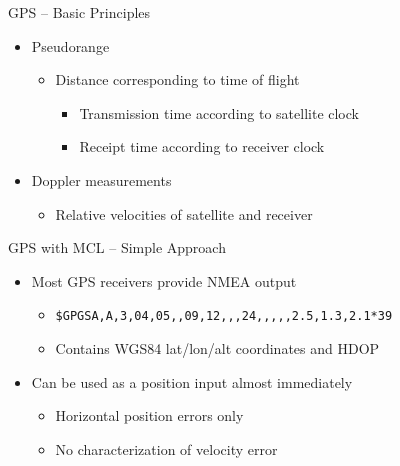 \documentclass[utf8,12pt]{beamer}
\begin{document}
{
\begin{frame}{GPS -- Basic Principles}
    \begin{itemize}
        \item Pseudorange
        \begin{itemize}
            \item Distance corresponding to time of flight
            \begin{itemize}
                \item Transmission time according to satellite clock
                \item Receipt time according to receiver clock
            \end{itemize}
        \end{itemize}
        \item Doppler measurements
        \begin{itemize}
            \item Relative velocities of satellite and receiver
        \end{itemize}
    \end{itemize}
\end{frame}
}

{
\begin{frame}[fragile]{GPS with MCL -- Simple Approach}
    \begin{itemize}
        \item Most GPS receivers provide NMEA output
        \begin{itemize}
            \item{\footnotesize\verb=$GPGSA,A,3,04,05,,09,12,,,24,,,,,2.5,1.3,2.1*39=}
            \item Contains WGS84 lat/lon/alt coordinates and HDOP
        \end{itemize}
        \item Can be used as a position input almost immediately
        \begin{itemize}
            \item Horizontal position errors only
            \item No characterization of velocity error
        \end{itemize}
    \end{itemize}
\end{frame}
}
\end{document}
